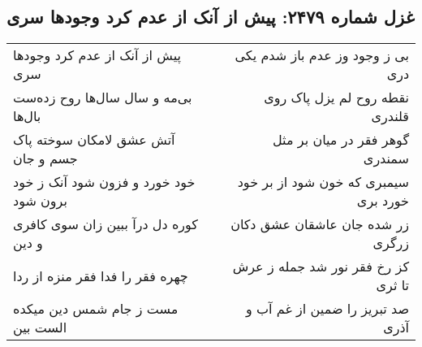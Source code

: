 \begin{center}
\section*{غزل شماره ۲۴۷۹: پیش از آنک از عدم کرد وجودها سری}
\label{sec:2479}
\begin{longtable}{l p{0.5cm} r}
پیش از آنک از عدم کرد وجودها سری
&&
بی ز وجود وز عدم باز شدم یکی دری
\\
بی‌مه و سال سال‌ها روح زده‌ست بال‌ها
&&
نقطه روح لم یزل پاک روی قلندری
\\
آتش عشق لامکان سوخته پاک جسم و جان
&&
گوهر فقر در میان بر مثل سمندری
\\
خود خورد و فزون شود آنک ز خود برون شود
&&
سیمبری که خون شود از بر خود خورد بری
\\
کوره دل درآ ببین زان سوی کافری و دین
&&
زر شده جان عاشقان عشق دکان زرگری
\\
چهره فقر را فدا فقر منزه از ردا
&&
کز رخ فقر نور شد جمله ز عرش تا ثری
\\
مست ز جام شمس دین میکده الست بین
&&
صد تبریز را ضمین از غم آب و آذری
\\
\end{longtable}
\end{center}
